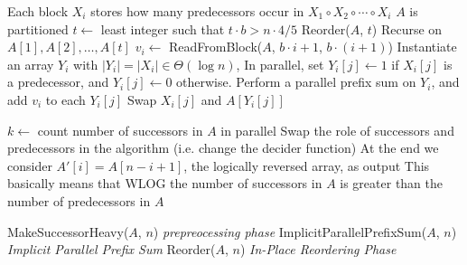 \documentclass[sigplan, 10pt, nonacm]{acmart}
\theoremstyle{remark}
\theoremstyle{remark}
\begin{document}
\begin{appendices}
\begin{figure*}
\begin{algorithmic}
    \Require Each block $X_i$ stores how many predecessors occur in $X_1 \circ X_2 \circ \cdots \circ X_i$
    \Ensure $A$ is partitioned
      \State $t \gets $ least integer such that $t\cdot b > n\cdot 4/5$
      \State Reorder($A$, $t$)
      \Comment Recurse on $A[1], A[2], \ldots, A[t]$
      \State $v_i \gets$ ReadFromBlock($A$, $b\cdot i+1$, $b\cdot(i+1)$) 
        \State Instantiate an array $Y_i$ with $|Y_i| = |X_i| \in \Theta(\log n)$, 
        \State In parallel, set $Y_i[j] \gets 1$ if $X_i[j]$ is a predecessor, and $Y_i[j] \gets 0$ otherwise.
        \State Perform a parallel prefix sum on $Y_i$, and add $v_i$ to each $Y_i[j]$
            \State Swap $X_i[j]$ and $A[Y_i[j]]$
          \EndIf
        \EndFor
      \EndFor
    \EndProcedure
    \State

      \State $k \gets$ count number of successors in $A$ in parallel
        \State Swap the role of successors and predecessors in the algorithm (i.e. change the decider function)
        \State At the end we consider $A'[i] = A[n-i+1]$, the logically reversed array, as output
        \State This basically means that WLOG the number of successors in $A$ is greater than the number of predecessors in $A$
      \EndIf

      \State MakeSuccessorHeavy($A$, $n$) \Comment \emph{prepreocessing phase}
      \State ImplicitParallelPrefixSum($A$, $n$) \Comment \emph{Implicit Parallel Prefix Sum}
      \State Reorder($A$, $n$) \Comment \emph{In-Place Reordering Phase}
    \EndProcedure
	\end{algorithmic}	
\end{figure*}

\end{appendices}

\clearpage
\clearpage



\end{document}
